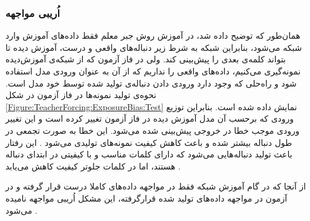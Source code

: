   \subsubsection{اُریبی مواجهه}
  همان‌طور که توضیح داده شد، در آموزش روش جبر معلم فقط داده‌های آموزش وارد شبکه می‌شود، بنابراین شبکه به شرط زیر دنباله‌های واقعی و درست، آموزش دیده تا بتواند کلمه‌ی بعدی را پیش‌بینی کند.
ولی در فاز آزمون که از شبکه‌ی آموزش‌دیده نمونه‌گیری می‌کنیم، داده‌های واقعی را نداریم که از آن به عنوان ورودی مدل استفاده شود و راه‌حلی که وجود دارد ورودی دادن دنباله‌ی تولید شده توسط خود مدل است. نحوه‌ی تولید نمونه‌ها در فاز آزمون در شکل
\ref{Figure:TeacherForcing:ExposureBias:Test}
 نمایش داده شده است.
 بنابراین توزیع ورودی که بر‌حسب آن مدل آموزش دیده در فاز آزمون تغییر کرده است و این تغییر ورودی موجب خطا در خروجی پیش‌بینی شده می‌شود. این خطا به صورت تجمعی در طول دنباله بیشتر شده و باعث کاهش  کیفیت نمونه‌های تولیدی می‌شود
 \cite{SeqGAN, Huszar15HowNot, bengio2015scheduled}
 . این رفتار باعث تولید دنباله‌هایی می‌شود که دارای کلمات مناسب و با کیفیتی در ابتدای دنباله  هستند، اما در کلمات جلوتر کیفیت کاهش می‌یابد
 \cite{Zhang2017TextGAN}.
 
 از آنجا که در گام آموزش شبکه فقط در مواجهه داده‌های کاملا درست قرار گرفته و در آزمون در مواجهه داده‌های تولید شده قرارگرفته، این مشکل  اُریبی مواجهه نامیده  می‌شود
  \cite{bengio2015scheduled, press2017langwasserstein}.

